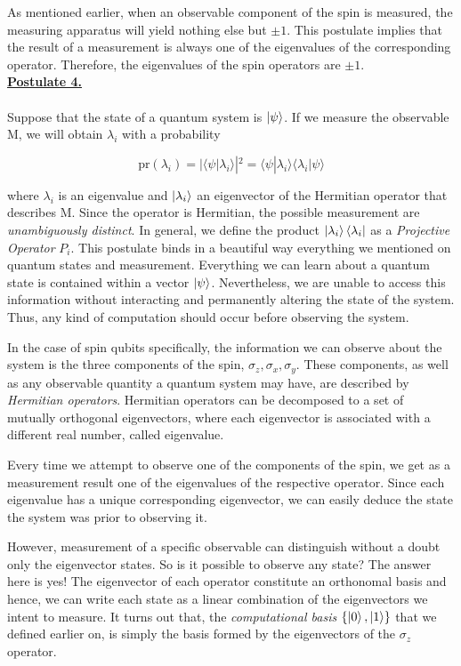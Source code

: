 \documentclass[12pt,a4paper]{report}
\begin{document}
\noindent
As mentioned earlier, when an observable component of the spin is measured, the measuring apparatus will yield nothing else but $\pm 1$. This postulate implies that the result of a measurement is always one of the eigenvalues of the corresponding operator. Therefore, the eigenvalues of the spin operators are $\pm 1$.
\\

\noindent
{\large \textbf{\underline{Postulate 4.}}}
\\~\\
Suppose that the state of a quantum system is $\ket{\psi}$. If we measure the observable M, we will obtain $\lambda_i$ with a probability

\begin{equation}
\text{pr}(\lambda_i) = |\langle \psi|\lambda_i \rangle|^2 = \langle \psi|\lambda_i \rangle \langle \lambda_i|\psi \rangle
\end{equation}

where $\lambda_i$ is an eigenvalue and $\ket{\lambda_i}$ an eigenvector of the Hermitian operator that describes M. Since the operator is Hermitian, the possible measurement are \emph{unambiguously distinct}. In general, we define the product $\ket{\lambda_i}\bra{\lambda_i}$ as a \emph{Projective Operator} $P_i$. This postulate binds in a beautiful way everything we mentioned on quantum states and measurement. Everything we can learn about a quantum state is contained within a vector $\ket{\psi}$. Nevertheless, we are unable to access this information without interacting and permanently altering the state of the system. Thus, any kind of computation should occur before observing the system.

In the case of spin qubits specifically, the information we can observe about the system is the three components of the spin, $\sigma_z, \sigma_x, \sigma_y$. These components, as well as any observable quantity a quantum system may have, are described by \emph{Hermitian operators}. Hermitian operators can be decomposed to a set of mutually orthogonal eigenvectors, where each eigenvector is associated with a different real number, called eigenvalue.

Every time we attempt to observe one of the components of the spin, we get as a measurement result one of the eigenvalues of the respective operator. Since each eigenvalue has a unique corresponding eigenvector, we can easily deduce the state the system was prior to observing it. 

However, measurement of a specific observable can distinguish without a doubt only the eigenvector states. So is it possible to observe any state? The answer here is yes! The eigenvector of each operator constitute an orthonomal basis and hence, we can write each state as a linear combination of the eigenvectors we intent to measure. It turns out that, the \emph{computational basis} $\{\ket{0},\ket{1}\}$ that we defined earlier on, is simply the basis formed by the eigenvectors of the $\sigma_z$ operator.
\\
\end{document}

